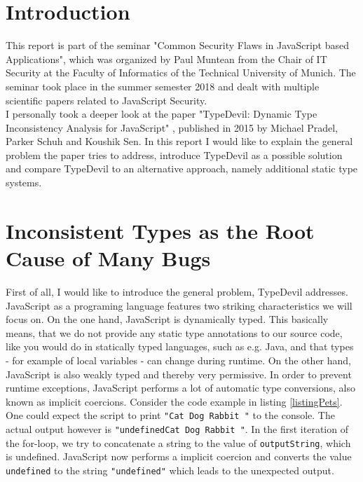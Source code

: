 \documentclass[runningheads,a4paper]{llncs}
\begin{document}
\newpage

\section{Introduction}

This report is part of the seminar "Common Security Flaws in JavaScript based Applications", which was organized by Paul Muntean from the Chair of IT Security at the Faculty of Informatics of the Technical University of Munich.
The seminar took place in the summer semester 2018 and dealt with multiple scientific papers related to JavaScript Security. \\
I personally took a deeper look at the paper "TypeDevil: Dynamic Type Inconsistency Analysis for JavaScript" \cite{DBLP:conf/icse/PradelSS15}, published in 2015 by Michael Pradel, Parker Schuh and Koushik Sen.
In this report I would like to explain the general problem the paper tries to address, introduce TypeDevil as a possible solution and compare TypeDevil to an alternative approach, namely additional static type systems. 

\section{Inconsistent Types as the Root Cause of Many Bugs}
First of all, I would like to introduce the general problem, TypeDevil addresses. \\
JavaScript as a programing language features two striking characteristics we will focus on. 
On the one hand, JavaScript is dynamically typed. 
This basically means, that we do not provide any static type annotations to our source code, like you would do in statically typed languages, such as e.g. Java, and that types - for example of local variables - can change during runtime.
On the other hand, JavaScript is also weakly typed and thereby very permissive. In order to prevent runtime exceptions, JavaScript performs a lot of automatic type conversions, also known as implicit coercions.
Consider the code example in listing \ref{listingPets}. 
One could expect the script to print \lstinline[columns=fixed]{"Cat Dog Rabbit "} to the console.
The actual output however is \lstinline[columns=fixed]{"undefinedCat Dog Rabbit "}. 
In the first iteration of the for-loop, we try to concatenate a string to the value of \lstinline[columns=fixed]{outputString}, which is undefined. 
JavaScript now performs a implicit coercion and converts the value \lstinline[columns=fixed]{undefined} to the string \lstinline[columns=fixed]{"undefined"} which leads to the unexpected output.
\end{document}
